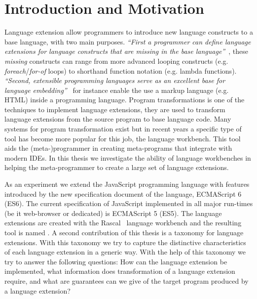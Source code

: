 
\chapter{Introduction and Motivation}

\label{Chapter1}


Language extension allow programmers to introduce new language constructs to a base language, with two main purposes. \textit{``First a programmer can define language extensions for language constructs that are missing in the base language''}~\cite{Erdweg2014a}, these \textit{missing} constructs can range from more advanced looping constructs (e.g. \textit{foreach}/\textit{for-of} loops) to shorthand function notation (e.g. lambda functions). \textit{``Second, extensible programming languages serve as an excellent base for language embedding''}~\cite{Erdweg2014a} for instance enable the use a markup language (e.g. HTML) inside a programming language. Program transformations is one of the techniques to implement language extensions, they are used to transform language extensions from the source program to base language code. Many systems for program transformation exist but in recent years a specific type of tool has become more popular for this job, the language workbench. This tool aids the (meta-)programmer in creating meta-programs that integrate with modern IDEs. In this thesis we investigate the ability of language workbenches in helping the meta-programmer to create a large set of language extensions. 

As an experiment we extend the JavaScript programming language with features introduced by the new specification document of the language, ECMAScript 6 (ES6). The current specification of JavaScript implemented in all major run-times (be it web-browser or dedicated) is ECMAScript 5 (ES5). The language extensions are created with the Rascal~\cite{Klint} language workbench and the resulting tool is named \projectname{}. A second contribution of this thesis is a taxonomy for language extensions. With this taxonomy we try to capture the distinctive characteristics of each language extension in a generic way. With the help of this taxonomy we try to answer the following questions: How can the language extension be implemented, what information does transformation of a language extension require, and what are guarantees can we give of the target program produced by a language extension?

